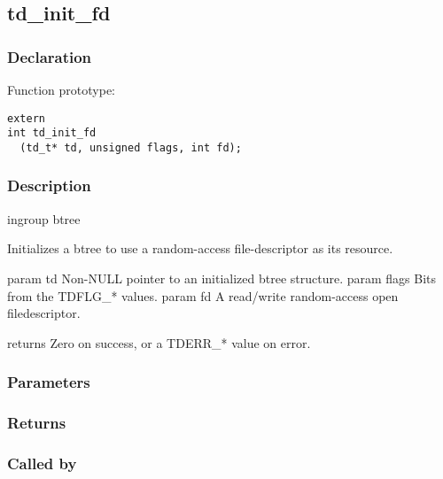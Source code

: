 
\newpage
\subsection{td\_init\_fd}
\subsubsection{Declaration} Function prototype:

\begin{verbatim}
extern
int td_init_fd
  (td_t* td, unsigned flags, int fd);
\end{verbatim}

\subsubsection{Description}


 ingroup btree

 Initializes a btree to use a random-access file-descriptor as its resource.

 param td Non-NULL pointer to an initialized btree structure.
 param flags Bits from the TDFLG\_* values.
 param fd A read/write random-access open filedescriptor.

 returns Zero on success, or a TDERR\_* value on error.
 

\subsubsection{Parameters}
\subsubsection{Returns}
\subsubsection{Called by}
